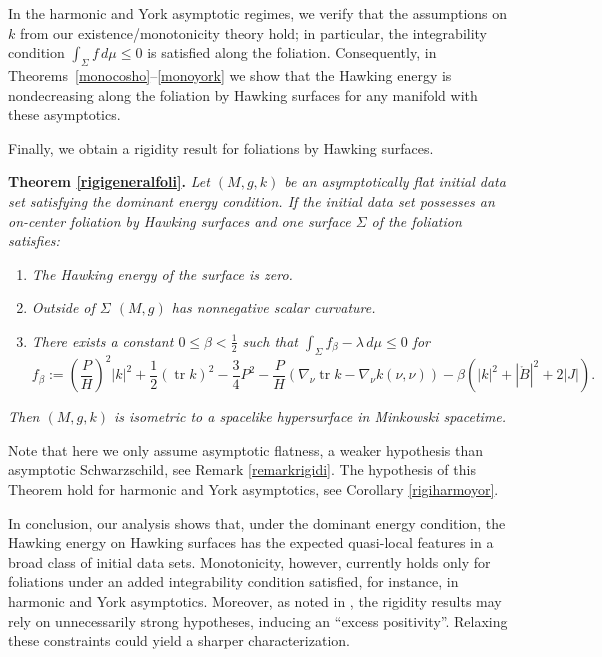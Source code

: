 \documentclass[12pt,a4paper]{amsart}
\theoremstyle{plain}
\theoremstyle{definition}
\newcommand{\tr}{\operatorname{tr}}
\begin{document}
In the harmonic and York asymptotic regimes, we verify that the assumptions on $k$ from our existence/monotonicity theory hold; in particular, the integrability condition $\int_\Sigma f\,d\mu \le 0$ is satisfied along the foliation. Consequently, in Theorems~\ref{monocosho}–\ref{monoyork} we show that the Hawking energy is nondecreasing along the foliation by Hawking surfaces for any manifold with these asymptotics.


Finally,  we obtain a rigidity result for   foliations by Hawking surfaces.

\noindent\textbf{Theorem \ref{rigigeneralfoli}.} \emph{Let $(M,g,k)$ be an asymptotically flat  initial data set satisfying the dominant energy condition. If the initial data set possesses an on-center foliation by Hawking surfaces   and one  surface $\Sigma$ of the foliation satisfies:}

    \begin{enumerate}[label=(\roman*)]
    
    \item \emph{The Hawking energy of the surface is zero.}
    
    \item \emph{Outside of $\Sigma$  $(M,g)$ has nonnegative scalar curvature.} 

    \item \emph{There exists a constant $0\leq\beta <\frac{1}{2}$ such that $\int_\Sigma f_\beta -\lambda \, d\mu \leq 0$  for 
 \begin{equation*}
       f_\beta:= \left( \frac{P}{H}\right)^2|k|^2+ \frac{1}{2 }(\tr k)^2   - \frac{3}{4} P^2- \frac{P}{H}( \nabla_\nu \tr k - \nabla_\nu k(\nu,\nu ))  -  \beta( |k|^2 + |\mathring{B}|^2 +2|J|).
    \end{equation*} }
\end{enumerate}    
\emph{Then $(M,g,k)$ is isometric to a spacelike hypersurface in  Minkowski spacetime.}

Note that here we only assume asymptotic flatness, a weaker hypothesis than asymptotic Schwarzschild, see Remark \ref{remarkrigidi}. The hypothesis of this Theorem hold for harmonic and York asymptotics, see  Corollary \ref{rigiharmoyor}.








In conclusion, our analysis shows that, under the dominant energy condition, the Hawking energy on Hawking surfaces has the expected quasi-local features in a broad class of initial data sets. Monotonicity, however,  currently holds only for foliations under an added integrability condition satisfied, for instance, in harmonic and York asymptotics. Moreover, as noted in \cite{rigidiaz}, the rigidity results may rely on unnecessarily strong hypotheses, inducing an “excess positivity”. Relaxing these constraints could yield a sharper characterization.
\end{document}
